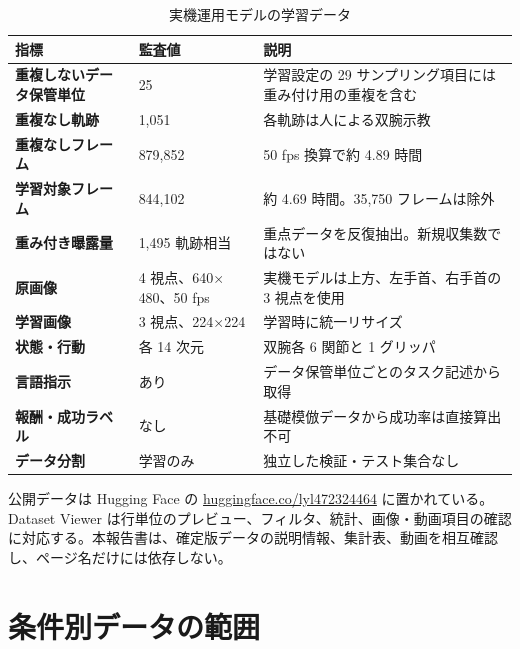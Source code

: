 \begin{table}[H]
\centering
\small
\caption{実機運用モデルの学習データ}
\begin{tabularx}{\textwidth}{>{\japanesesans\bfseries}p{31mm}p{39mm}X}
\toprule
指標 & 監査値 & 説明\\
\midrule
重複しないデータ保管単位 & 25 & 学習設定の 29 サンプリング項目には重み付け用の重複を含む\\
重複なし軌跡 & 1,051 & 各軌跡は人による双腕示教\\
重複なしフレーム & 879,852 & 50 fps 換算で約 4.89 時間\\
学習対象フレーム & 844,102 & 約 4.69 時間。35,750 フレームは除外\\
重み付き曝露量 & 1,495 軌跡相当 & 重点データを反復抽出。新規収集数ではない\\
原画像 & 4 視点、640$\times$480、50 fps & 実機モデルは上方、左手首、右手首の 3 視点を使用\\
学習画像 & 3 視点、224$\times$224 & 学習時に統一リサイズ\\
状態・行動 & 各 14 次元 & 双腕各 6 関節と 1 グリッパ\\
言語指示 & あり & データ保管単位ごとのタスク記述から取得\\
報酬・成功ラベル & なし & 基礎模倣データから成功率は直接算出不可\\
データ分割 & 学習のみ & 独立した検証・テスト集合なし\\
\bottomrule
\end{tabularx}
\end{table}

公開データは Hugging Face の
\href{https://huggingface.co/lyl472324464}{huggingface.co/lyl472324464}
に置かれている。Dataset Viewer は行単位のプレビュー、フィルタ、統計、画像・動画項目の確認に対応する\cite{hf_dataset_viewer}。本報告書は、確定版データの説明情報、集計表、動画を相互確認し、ページ名だけには依存しない。


\section{条件別データの範囲}


